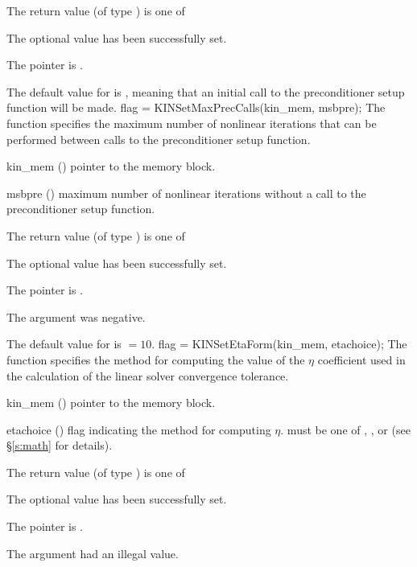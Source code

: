 {
  The return value  (of type ) is one of
  \begin{args}
  \item[\Id{KIN\_SUCCESS}] 
    The optional value has been successfully set.
  \item[\Id{KIN\_MEM\_NULL}]
    The  pointer is .
  \end{args}
}
{
  The default value for \id{} is , meaning that an initial call
  to the preconditioner setup function will be made.
}
{
flag = KINSetMaxPrecCalls(kin\_mem, msbpre);
}
{
  The function  specifies the maximum number of 
  nonlinear iterations that can be performed between calls to the 
  preconditioner setup function.
}
{
  \begin{args}
  \item[kin\_mem] ()
    pointer to the {\kinsol} memory block.
  \item[msbpre] ()
    maximum number of nonlinear iterations without a call
    to the preconditioner setup function.
  \end{args}
}
{
  The return value  (of type ) is one of
  \begin{args}
  \item[\Id{KIN\_SUCCESS}] 
    The optional value has been successfully set.
  \item[\Id{KIN\_MEM\_NULL}]
    The  pointer is .
  \item[\Id{KIN\_ILL\_INPUT}]
    The argument  was negative.
  \end{args}
}
{
  The default value for  is  $=10$.
}
{
flag = KINSetEtaForm(kin\_mem, etachoice);
}
{
  The function  specifies the method for computing
  the value of the $\eta$ coefficient used in the calculation of the
  linear solver convergence tolerance.
}
{
  \begin{args}[etachoice]
  \item[kin\_mem] ()
    pointer to the {\kinsol} memory block.
  \item[etachoice] ()
    flag indicating the method for computing $\eta$.  must be one
    of , , or 
    (see \S\ref{s:math} for details).
  \end{args}
}
{
  The return value  (of type ) is one of
  \begin{args}
  \item[\Id{KIN\_SUCCESS}] 
    The optional value has been successfully set.
  \item[\Id{KIN\_MEM\_NULL}]
    The  pointer is .
  \item[\Id{KIN\_ILL\_INPUT}]
    The argument  had an illegal value.
  \end{args}
}

